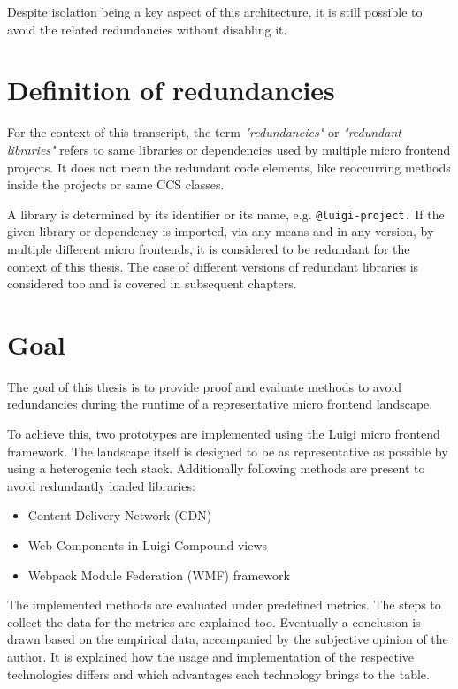 Despite isolation being a key aspect of this architecture, it is still possible to avoid the related redundancies without disabling it.

\section{Definition of redundancies}

For the context of this transcript, the term \textit{"redundancies"} or \textit{"redundant libraries"} refers to same libraries or dependencies used by multiple micro frontend projects. It does not mean the redundant code elements, like reoccurring methods inside the projects or same CCS classes. 

A library is determined by its identifier or its name, e.g. \texttt{@luigi-project.} If the given library or dependency is imported, via any means and in any version, by multiple different micro frontends, it is considered to be redundant for the context of this thesis. The case of different versions of redundant libraries is considered too and is covered in subsequent chapters.

\section{Goal}

The goal of this thesis is to provide proof and evaluate methods to avoid redundancies during the runtime of a representative micro frontend landscape. 

To achieve this, two prototypes are implemented using the Luigi micro frontend framework. The landscape itself is designed to be as representative as possible by using a heterogenic tech stack. Additionally following methods are present to avoid redundantly loaded libraries:

\begin{itemize}
	\item Content Delivery Network (CDN)
	\item Web Components in Luigi Compound views
	\item Webpack Module Federation (WMF) framework
\end{itemize}

The implemented methods are evaluated under predefined metrics. The steps to collect the data for the metrics are explained too.
Eventually a conclusion is drawn based on the empirical data, accompanied by the subjective opinion of the author. It is explained how the usage and implementation of the respective technologies differs and which advantages each technology brings to the table.
  
